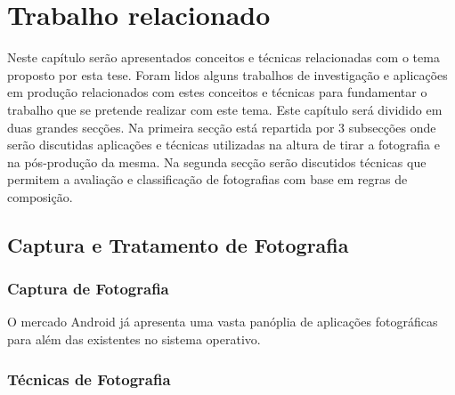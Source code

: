 \chapter{Trabalho relacionado}
\label{cha:related_work}
Neste capítulo serão apresentados conceitos e técnicas relacionadas com o tema proposto por esta tese. Foram lidos alguns trabalhos de investigação e aplicações em produção relacionados com estes conceitos e técnicas para fundamentar o trabalho que se pretende realizar com este tema. Este capítulo será dividido em duas grandes secções. Na primeira secção está repartida por 3 subsecções onde serão discutidas aplicações e técnicas utilizadas na altura de tirar a fotografia e na pós-produção da mesma. Na segunda secção serão discutidos técnicas que permitem a avaliação e classificação de fotografias com base em regras de composição.

\section{Captura e Tratamento de Fotografia}
\label{sec:foto_capture_handle}

\subsection{Captura de Fotografia}
\label{sub:foto_capture}

O mercado Android já apresenta uma vasta panóplia de aplicações fotográficas para além das existentes no sistema operativo. 

\subsection{Técnicas de Fotografia}
\label{sub:foto_tecniques}

	
